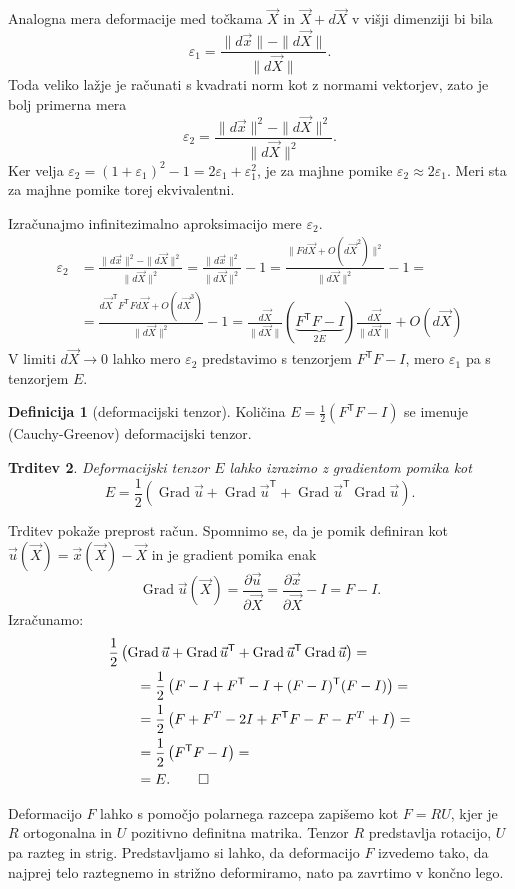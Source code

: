 \documentclass[a4paper,twoside]{article}
\theoremstyle{definition} %
\newtheorem{definicija}{Definicija}[section]
\theoremstyle{plain} %
\newtheorem{trditev}[definicija]{Trditev}
\numberwithin{equation}{section}
\newcommand{\T}{\mathsf{T}}
\newcommand{\Grad}{\operatorname{Grad}}
\newcommand{\eps}{\varepsilon}
\newcommand{\dpar}[2]{\ensuremath{\frac{\partial #1}{\partial #2}}}
\newcommand{\vu}{\vec{u}}
\newcommand{\vX}{\vec{X}}
\newcommand{\vx}{\vec{x}}
\begin{document}
Analogna mera deformacije med točkama $\vX$ in $\vX+d\vX$ v višji dimenziji bi bila
\[
  \eps_1 = \frac{\|d\vx\| - \|d\vX\|}{\|d\vX\|}.
\]
Toda veliko lažje je računati s kvadrati norm kot z normami vektorjev, zato je
bolj primerna mera
\[
  \eps_2 = \frac{\|d\vx\|^2 - \|d\vX\|^2}{\|d\vX\|^2}.
\]
Ker velja $\eps_2 = (1+\eps_1)^2 - 1 = 2\eps_1 + \eps_1^2$, je za majhne pomike
$\eps_2 \approx 2\eps_1$. Meri sta za majhne pomike torej ekvivalentni.

Izračunajmo infinitezimalno aproksimacijo mere $\eps_2$.
\begin{align*}
  \eps_2 &=
  \frac{\|d\vx\|^2 - \|d\vX\|^2}{\|d\vX\|^2} =
  \frac{\|d\vx\|^2}{\|d\vX\|^2}  - 1=
  \frac{\|F d\vX + O(d\vX^2)\|^2}{\|d\vX\|^2} - 1 = \\ &=
  \frac{d\vX^\T F^\T F d\vX + O(d\vX^3)}{\|d\vX\|^2} - 1 =
  \frac{d\vX}{\|d\vX\|}(\underbrace{F^\T F - I}_{2E})\frac{d\vX}{\|d\vX\|} + O(d\vX)
\end{align*}
V limiti $d\vX \to 0$ lahko mero $\eps_2$ predstavimo s tenzorjem $F^\T F- I$,
mero $\eps_1$ pa s tenzorjem $E$.

\begin{definicija}[deformacijski tenzor]
  Količina $E = \frac12 (F^\T F - I)$ se imenuje (Cauchy-Greenov)
  deformacijski tenzor.
\end{definicija}
\begin{trditev}
  Deformacijski tenzor $E$ lahko izrazimo z gradientom pomika kot
  \[ E = \frac12\left( \Grad \vu + \Grad \vu^\T + \Grad \vu^\T \Grad \vu \right). \]
\end{trditev}
\proof
Trditev pokaže preprost račun. Spomnimo se, da je pomik definiran kot $\vu(\vX) =
\vx(\vX) - \vX$ in je gradient pomika enak
\[
  \Grad \vu(\vX) = \dpar{\vu}{\vX} = \dpar{\vx}{\vX} - I = F - I.
\]
Izračunamo:
\begin{align*}
  &\frac12\left( \Grad \vu + \Grad \vu^\T + \Grad \vu^\T \Grad \vu \right) = \\
  &\qquad=\frac12\left(F - I + F^\T - I  + (F-I)^\T(F-I)\right) = \\
  &\qquad=\frac12\left(F + F^T - 2I + F^\T F - F - F^T + I\right) = \\
  &\qquad=\frac12\left(F^\T F - I\right) = \\
  &\qquad=E.\qedhere
\end{align*}
\endproof

Deformacijo $F$ lahko s pomočjo polarnega razcepa zapišemo kot $F = RU$, kjer je
$R$ ortogonalna in $U$ pozitivno definitna matrika. Tenzor $R$ predstavlja
rotacijo, $U$ pa razteg in strig. Predstavljamo si lahko, da deformacijo $F$
izvedemo tako, da najprej telo raztegnemo in strižno deformiramo, nato pa
zavrtimo v končno lego.
\end{document}
